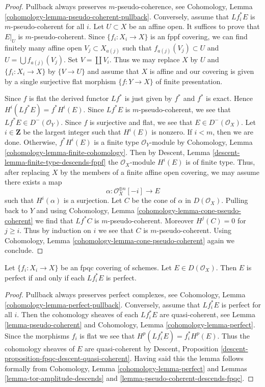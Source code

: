 \begin{proof}
Pullback always preserves $m$-pseudo-coherence, see
Cohomology, Lemma \ref{cohomology-lemma-pseudo-coherent-pullback}.
Conversely, assume that $Lf_i^*E$ is $m$-pseudo-coherent for all $i$.
Let $U \subset X$ be an affine open. It suffices to prove that
$E|_U$ is $m$-pseudo-coherent. Since $\{f_i : X_i \to X\}$ is an
fppf covering, we can find finitely many affine open $V_j \subset X_{a(j)}$
such that $f_{a(j)}(V_j) \subset U$ and $U = \bigcup f_{a(j)}(V_j)$.
Set $V = \coprod V_i$.
Thus we may replace $X$ by $U$ and $\{f_i : X_i \to X\}$ by
$\{V \to U\}$ and assume that $X$ is affine and our covering
is given by a single surjective flat morphism $\{f : Y \to X\}$
of finite presentation.

\medskip\noindent
Since $f$ is flat the derived functor $Lf^*$ is just given by $f^*$ and $f^*$
is exact. Hence $H^i(Lf^*E) = f^*H^i(E)$. Since $Lf^*E$ is $m$-pseudo-coherent,
we see that $Lf^*E \in D^-(\mathcal{O}_Y)$. Since $f$ is surjective and flat,
we see that $E \in D^-(\mathcal{O}_X)$. Let $i \in \mathbf{Z}$ be the largest
integer such that $H^i(E)$ is nonzero. If $i < m$, then we are done. Otherwise,
$f^*H^i(E)$ is a finite type $\mathcal{O}_Y$-module by
Cohomology, Lemma \ref{cohomology-lemma-finite-cohomology}.
Then by Descent, Lemma \ref{descent-lemma-finite-type-descends-fppf}
the $\mathcal{O}_X$-module $H^i(E)$ is of finite type.
Thus, after replacing $X$ by the members of a finite affine open covering,
we may assume there exists a map
$$
\alpha : \mathcal{O}_X^{\oplus n}[-i] \longrightarrow E
$$
such that $H^i(\alpha)$ is a surjection. Let $C$ be the cone of $\alpha$
in $D(\mathcal{O}_X)$. Pulling back to $Y$ and using
Cohomology, Lemma \ref{cohomology-lemma-cone-pseudo-coherent}
we find that $Lf^*C$ is $m$-pseudo-coherent. Moreover $H^j(C) = 0$
for $j \geq i$. Thus by induction on $i$ we see that $C$ is
$m$-pseudo-coherent. Using
Cohomology, Lemma \ref{cohomology-lemma-cone-pseudo-coherent}
again we conclude.
\end{proof}

\begin{lemma}
\label{lemma-perfect-descends-fpqc}
Let $\{f_i : X_i \to X\}$ be an fpqc covering of schemes. Let
$E \in D(\mathcal{O}_X)$. Then $E$ is perfect
if and only if each $Lf_i^*E$ is perfect.
\end{lemma}

\begin{proof}
Pullback always preserves perfect complexes, see
Cohomology, Lemma \ref{cohomology-lemma-perfect-pullback}.
Conversely, assume that $Lf_i^*E$ is perfect for all $i$.
Then the cohomology sheaves of each $Lf_i^*E$ are quasi-coherent, see
Lemma \ref{lemma-pseudo-coherent}
and
Cohomology, Lemma \ref{cohomology-lemma-perfect}.
Since the morphisms $f_i$ is flat we see that $H^p(Lf_i^*E) = f_i^*H^p(E)$.
Thus the cohomology sheaves of $E$ are quasi-coherent by
Descent, Proposition \ref{descent-proposition-fpqc-descent-quasi-coherent}.
Having said this the lemma follows formally from
Cohomology, Lemma \ref{cohomology-lemma-perfect}
and
Lemmas \ref{lemma-tor-amplitude-descends} and
\ref{lemma-pseudo-coherent-descends-fpqc}.
\end{proof}


